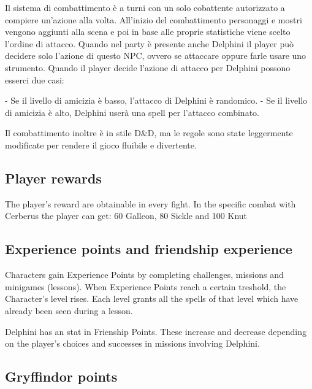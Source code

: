 Il sistema di combattimento è a turni con un solo cobattente autorizzato a compiere un'azione alla volta. All'inizio del combattimento personaggi e mostri vengono aggiunti alla scena e poi in base alle proprie statistiche viene scelto l'ordine di attacco. Quando nel party è presente anche Delphini il player può decidere solo l'azione di questo NPC, ovvero se attaccare oppure farle usare uno strumento. Quando il player decide l'azione di attacco per Delphini possono esserci due casi:

- Se il livello di amicizia è basso, l'attacco di Delphini è randomico.
- Se il livello di amicizia è alto, Delphini userà una spell per l'attacco combinato.

Il combattimento inoltre è in stile D\&D, ma le regole sono state leggermente modificate per rendere il gioco fluibile e divertente.


\subsection{Player rewards}

The player's reward are obtainable in every fight. In the specific combat with Cerberus the player can get: 60 Galleon, 80 Sickle and 100 Knut


\subsection{ Experience points and friendship experience}

Characters gain Experience Points by completing challenges, missions and minigames (lessons). When Experience Points reach a certain treshold, the Character's level rises. 
Each level grants all the spells of that level which have already been seen during a lesson.

Delphini has an stat in Frienship Points. These increase and decrease depending on the player's choices and successes in missions involving Delphini.


\subsection{Gryffindor points}

